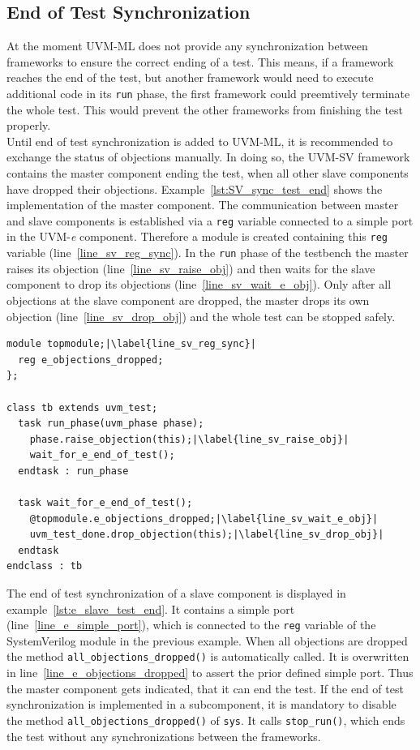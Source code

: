 \subsection{End of Test Synchronization}
At the moment UVM-ML does not provide any synchronization between frameworks to ensure the correct ending of a test. This means, if a framework reaches the end of the test, but another framework would need to execute additional code in its \lstinline$run$ phase, the first framework could preemtively terminate the whole test. This would prevent the other frameworks from finishing the test properly.\\
Until end of test synchronization is added to UVM-ML, it is recommended to exchange the status of objections manually. In doing so, the UVM-SV framework contains the master component ending the test, when all other slave components have dropped their objections. Example~\ref{lst:SV_sync_test_end} shows the implementation of the master component. The communication between master and slave components is established via a \lstinline$reg$ variable connected to a simple port in the UVM-\textit{e} component. Therefore a module is created containing this \lstinline$reg$ variable (line~\ref{line_sv_reg_sync}). In the \lstinline$run$ phase of the testbench the master raises its objection (line~\ref{line_sv_raise_obj}) and then waits for the slave component to drop its objections (line~\ref{line_sv_wait_e_obj}). Only after all objections at the slave component are dropped, the master drops its own objection (line~\ref{line_sv_drop_obj}) and the whole test can be stopped safely.
\lstset{language=SystemVerilog, numbers = left, escapechar=|, breaklines=true}
\begin{lstlisting}[frame=htrbl, caption={SystemVerilog: ending the test when UVM-\textit{e} components are ready},
label={lst:SV_sync_test_end}]
module topmodule;|\label{line_sv_reg_sync}|
  reg e_objections_dropped;
};

class tb extends uvm_test;
  task run_phase(uvm_phase phase);
    phase.raise_objection(this);|\label{line_sv_raise_obj}|
    wait_for_e_end_of_test();
  endtask : run_phase
  
  task wait_for_e_end_of_test();
    @topmodule.e_objections_dropped;|\label{line_sv_wait_e_obj}|
    uvm_test_done.drop_objection(this);|\label{line_sv_drop_obj}|
  endtask
endclass : tb
\end{lstlisting}
The end of test synchronization of a slave component is displayed in example~\ref{lst:e_slave_test_end}. It contains a simple port (line~\ref{line_e_simple_port}), which is connected to the \lstinline$reg$ variable of the SystemVerilog module in the previous example. When all objections are dropped the method \lstinline$all_objections_dropped()$ is automatically called. It is overwritten in line~\ref{line_e_objections_dropped} to assert the prior defined simple port. Thus the master component gets indicated, that it can end the test. If the end of test synchronization is implemented in a subcomponent, it is mandatory to disable the method \lstinline$all_objections_dropped()$ of \lstinline$sys$. It calls \lstinline$stop_run()$, which ends the test without any synchronizations between the frameworks.
